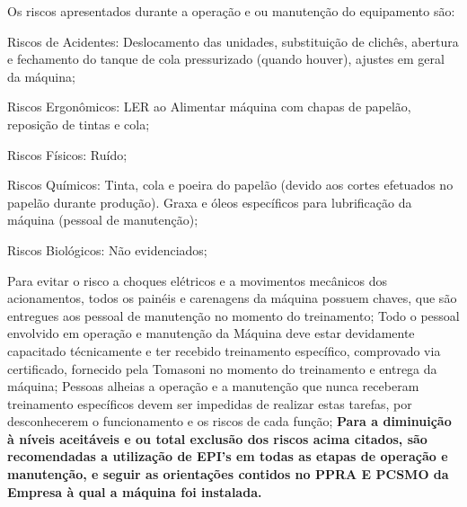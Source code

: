 Os riscos apresentados durante a operação e ou manutenção do equipamento são:



\begin{typeOfRisks}
\item[\ding{\dingNumber}] Riscos de Acidentes: Deslocamento das unidades, substituição de clichês, abertura e fechamento do tanque de cola pressurizado (quando houver), ajustes em geral da máquina;
\item[\ding{\dingNumber}] Riscos Ergonômicos: LER ao Alimentar máquina com chapas de papelão, reposição de tintas e cola;
\item[\ding{\dingNumber}] Riscos Físicos: Ruído;
\item[\ding{\dingNumber}] Riscos Químicos: Tinta, cola e poeira do papelão (devido aos cortes efetuados no papelão durante produção). Graxa e
óleos específicos para lubrificação da máquina (pessoal de manutenção);
\item[\ding{\dingNumber}] Riscos Biológicos: Não evidenciados;
\end{typeOfRisks}
Para evitar o risco a choques elétricos e a movimentos mecânicos dos acionamentos, todos os painéis e carenagens da
máquina possuem chaves, que são entregues aos pessoal de manutenção no momento do treinamento;
Todo o pessoal envolvido em operação e manutenção da Máquina deve estar devidamente capacitado técnicamente e ter
recebido treinamento específico, comprovado via certificado, fornecido pela Tomasoni no momento do treinamento e
entrega da máquina;
Pessoas alheias a operação e a manutenção que nunca receberam treinamento específicos devem ser impedidas de
realizar estas tarefas, por desconhecerem o funcionamento e os riscos de cada função;
\textbf{Para a diminuição à níveis aceitáveis e ou total exclusão dos riscos acima citados, são recomendadas a utilização de EPI's
em todas as etapas de operação e manutenção, e seguir as orientações contidos no PPRA E PCSMO da Empresa à qual a
máquina foi instalada.}

